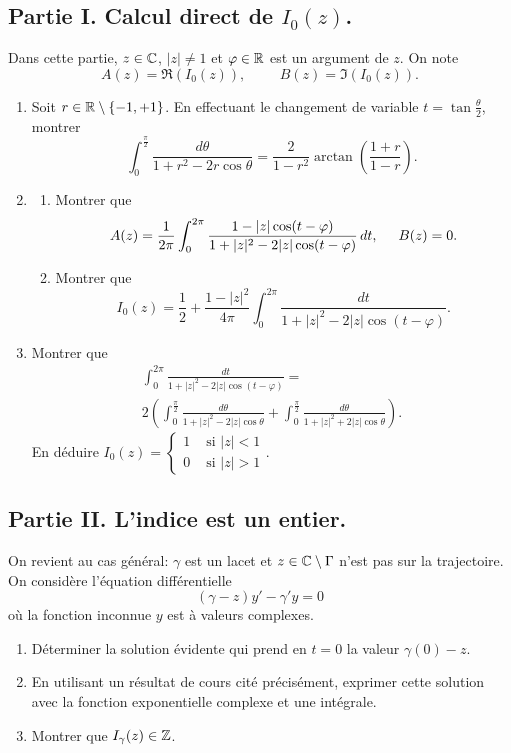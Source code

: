 \subsection*{Partie I. Calcul direct de $I_0(z)$.}
Dans cette partie, $z \in \mathbb{C}$, $|z|\neq 1$ et $\varphi\in \mathbb{R}$ est un argument de $z$. On note
\[
 A(z) = \Re(I_0(z)), \hspace{1cm} B(z) = \Im(I_0(z)).
\]
\begin{enumerate}
 \item Soit $r \in \mathbb{R} \setminus\left\lbrace -1, +1 \right\rbrace$. En effectuant le changement de variable $t = \tan \frac{\theta}{2}$, montrer
\[
 \int_0^{\frac{\pi}{2}}\frac{d\theta}{1+r^2 - 2r\cos \theta}
 =
 \frac{2}{1-r^2}\arctan\left( \frac{1 + r}{1 - r}\right) .
\]

 \item 
 \begin{enumerate}
  \item  Montrer que
\[
 A(z) = \frac{1}{2\pi}\int_{0}^{2\pi}\frac{1 - |z| \cos(t-\varphi)}{1 + |z|^2 - 2|z|\cos(t-\varphi)}\, dt, \hspace{0.5cm}
 B(z) = 0.
\]
  \item Montrer que 
\[
 I_0(z) = \frac{1}{2} + 
 \frac{1-|z|^2}{4\pi}
 \int_0^{2\pi}\frac{dt}{1 + |z|^2 - 2|z|\cos(t-\varphi)}.
\]
 \end{enumerate}

  \item Montrer que
\begin{multline*}
 \int_0^{2\pi}\frac{dt}{1 + |z|^2 - 2|z|\cos(t-\varphi)} = \\
 2\left( 
 \int_0^{\frac{\pi}{2}}\frac{d\theta}{1 + |z|^2 - 2|z|\cos \theta}
 +
 \int_0^{\frac{\pi}{2}}\frac{d\theta}{1 + |z|^2 + 2|z|\cos \theta}
 \right) .
\end{multline*}
En déduire
$
I_0(z)=
\left\lbrace 
\begin{aligned}
 1 &\text{ si } |z| < 1\\
 0 &\text{ si } |z| > 1
\end{aligned}
\right. 
$.
\end{enumerate}

\subsection*{Partie II. L'indice est un entier.}
On revient au cas général: $\gamma$ est un lacet et $z \in \mathbb{C} \setminus \Gamma$ n'est pas sur la trajectoire.
On considère l'équation différentielle
\begin{equation*}
 (\gamma - z) y' - \gamma' y = 0
\end{equation*}
où la fonction inconnue $y$ est à valeurs complexes.
\begin{enumerate}
 \item Déterminer la solution évidente qui prend en $t=0$ la valeur $\gamma(0) - z$.
 \item En utilisant un résultat de cours cité précisément, exprimer cette solution avec la fonction exponentielle complexe et une intégrale.
 \item Montrer que $I_\gamma(z) \in \mathbb{Z}$.
\end{enumerate}

